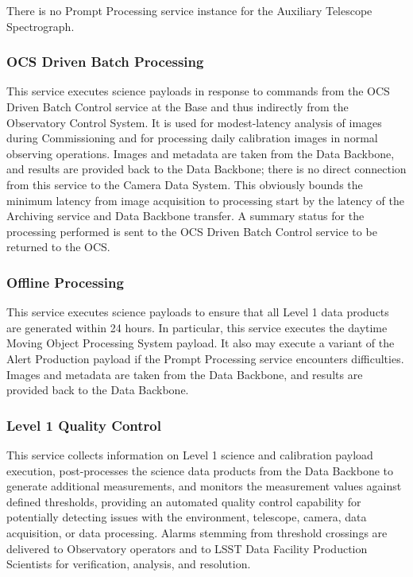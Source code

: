 \documentclass[DM,lsstdraft,toc]{lsstdoc}
\begin{document}
There is no Prompt Processing service instance for the Auxiliary
Telescope Spectrograph.

\subsubsection{OCS Driven Batch
Processing}\label{ocs-driven-batch-processing}

This service executes science payloads in response to commands from the
OCS Driven Batch Control service at the Base and thus indirectly from
the Observatory Control System. It is used for modest-latency analysis
of images during Commissioning and for processing daily calibration
images in normal observing operations. Images and metadata are taken
from the Data Backbone, and results are provided back to the Data
Backbone; there is no direct connection from this service to the Camera
Data System. This obviously bounds the minimum latency from image
acquisition to processing start by the latency of the Archiving service
and Data Backbone transfer. A summary status for the processing
performed is sent to the OCS Driven Batch Control service to be returned
to the OCS.

\subsubsection{Offline Processing}\label{offline-processing}

This service executes science payloads to ensure that all Level 1 data
products are generated within 24 hours. In particular, this service
executes the daytime Moving Object Processing System payload. It also
may execute a variant of the Alert Production payload if the Prompt
Processing service encounters difficulties. Images and metadata are
taken from the Data Backbone, and results are provided back to the Data
Backbone.

\subsubsection{Level 1 Quality Control}\label{level-1-quality-control}

This service collects information on Level 1 science and calibration
payload execution, post-processes the science data products from the
Data Backbone to generate additional measurements, and monitors the
measurement values against defined thresholds, providing an automated
quality control capability for potentially detecting issues with the
environment, telescope, camera, data acquisition, or data processing.
Alarms stemming from threshold crossings are delivered to Observatory
operators and to LSST Data Facility Production Scientists for
verification, analysis, and resolution.
\end{document}
